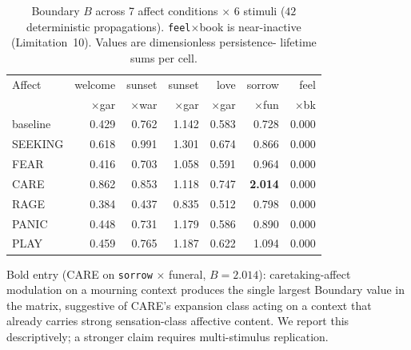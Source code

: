 \documentclass{article}
\begin{document}
\begin{table}[h]
\centering
\caption{Boundary $B$ across 7 affect conditions $\times$ 6 stimuli
($42$ deterministic propagations). \texttt{feel}$\times$book is
near-inactive (Limitation~10). Values are dimensionless persistence-
lifetime sums per cell.}
\label{tab:appendix_boundary_full}
\small
\begin{tabular}{lrrrrrr}
\toprule
Affect & welcome & sunset & sunset & love & sorrow & feel \\
       & $\times$gar & $\times$war & $\times$gar & $\times$gar & $\times$fun & $\times$bk \\
\midrule
baseline & 0.429 & 0.762 & 1.142 & 0.583 & 0.728 & 0.000 \\
SEEKING  & 0.618 & 0.991 & 1.301 & 0.674 & 0.866 & 0.000 \\
FEAR     & 0.416 & 0.703 & 1.058 & 0.591 & 0.964 & 0.000 \\
CARE     & 0.862 & 0.853 & 1.118 & 0.747 & \textbf{2.014} & 0.000 \\
RAGE     & 0.384 & 0.437 & 0.835 & 0.512 & 0.798 & 0.000 \\
PANIC    & 0.448 & 0.731 & 1.179 & 0.586 & 0.890 & 0.000 \\
PLAY     & 0.459 & 0.765 & 1.187 & 0.622 & 1.094 & 0.000 \\
\bottomrule
\end{tabular}
\end{table}

Bold entry (CARE on \texttt{sorrow} $\times$ funeral, $B = 2.014$):
caretaking-affect modulation on a mourning context produces the
single largest Boundary value in the matrix, suggestive of CARE's
expansion class acting on a context that already carries strong
sensation-class affective content. We report this descriptively; a
stronger claim requires multi-stimulus replication.
\end{document}
